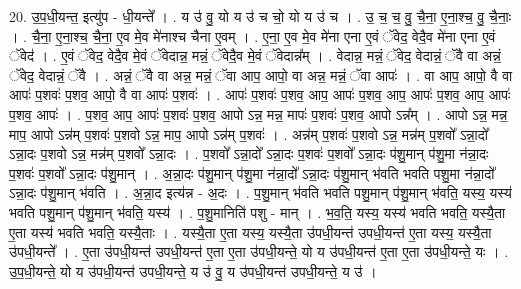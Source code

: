 \documentclass[17pt]{extarticle}
\begin{document}
20. उ॒प॒धी॒यन्त॒ इत्यु॑प - धी॒यन्ते᳚ । . य उ॑ वु॒ यो य उ॑ च चो॒ यो य उ॑ च । . उ॒ च॒ च॒ वु॒ चै॒ना॒ ए॒ना॒श्च॒ वु॒ चै॒नाः॒ । . चै॒ना॒ ए॒ना॒श्च॒ चै॒ना॒ ए॒व मे॒व मे॑नाश्च चैना ए॒वम् । . ए॒ना॒ ए॒व मे॒व मे॑ना एना ए॒वं ॅवेद॒ वेदै॒व मे॑ना एना ए॒वं ॅवेद॑ । . ए॒वं ॅवेद॒ वेदै॒व मे॒वं ॅवेदान्न॒ मन्नं॒ ॅवेदै॒व मे॒वं ॅवेदान्न᳚म् । . वेदान्न॒ मन्नं॒ ॅवेद॒ वेदान्नं॒ ॅवै वा अन्नं॒ ॅवेद॒ वेदान्नं॒ ॅवै । . अन्नं॒ ॅवै वा अन्न॒ मन्नं॒ ॅवा आप॒ आपो॒ वा अन्न॒ मन्नं॒ ॅवा आपः॑ । . वा आप॒ आपो॒ वै वा आपः॑ प॒शवः॑ प॒शव॒ आपो॒ वै वा आपः॑ प॒शवः॑ । . आपः॑ प॒शवः॑ प॒शव॒ आप॒ आपः॑ प॒शव॒ आप॒ आपः॑ प॒शव॒ आप॒ आपः॑ प॒शव॒ आपः॑ । . प॒शव॒ आप॒ आपः॑ प॒शवः॑ प॒शव॒ आपो ऽन्न॒ मन्न॒ मापः॑ प॒शवः॑ प॒शव॒ आपो ऽन्न᳚म् । . आपो ऽन्न॒ मन्न॒ माप॒ आपो ऽन्न॑म् प॒शवः॑ प॒शवो ऽन्न॒ माप॒ आपो ऽन्न॑म् प॒शवः॑ । . अन्न॑म् प॒शवः॑ प॒शवो ऽन्न॒ मन्न॑म् प॒शवो᳚ ऽन्ना॒दो᳚ ऽन्ना॒दः प॒शवो ऽन्न॒ मन्न॑म् प॒शवो᳚ ऽन्ना॒दः । . प॒शवो᳚ ऽन्ना॒दो᳚ ऽन्ना॒दः प॒शवः॑ प॒शवो᳚ ऽन्ना॒दः प॑शु॒मान् प॑शु॒मा न॑न्ना॒दः प॒शवः॑ प॒शवो᳚ ऽन्ना॒दः प॑शु॒मान् । . अ॒न्ना॒दः प॑शु॒मान् प॑शु॒मा न॑न्ना॒दो᳚ ऽन्ना॒दः प॑शु॒मान् भ॑वति भवति पशु॒मा न॑न्ना॒दो᳚ ऽन्ना॒दः प॑शु॒मान् भ॑वति । . अ॒न्ना॒द इत्य॑न्न - अ॒दः । . प॒शु॒मान् भ॑वति भवति पशु॒मान् प॑शु॒मान् भ॑वति॒ यस्य॒ यस्य॑ भवति पशु॒मान् प॑शु॒मान् भ॑वति॒ यस्य॑ । . प॒शु॒मानिति॑ पशु - मान् । . भ॒व॒ति॒ यस्य॒ यस्य॑ भवति भवति॒ यस्यै॒ता ए॒ता यस्य॑ भवति भवति॒ यस्यै॒ताः । . यस्यै॒ता ए॒ता यस्य॒ यस्यै॒ता उ॑पधी॒यन्त॑ उपधी॒यन्त॑ ए॒ता यस्य॒ यस्यै॒ता उ॑पधी॒यन्ते᳚ । . ए॒ता उ॑पधी॒यन्त॑ उपधी॒यन्त॑ ए॒ता ए॒ता उ॑पधी॒यन्ते॒ यो य उ॑पधी॒यन्त॑ ए॒ता ए॒ता उ॑पधी॒यन्ते॒ यः । . उ॒प॒धी॒यन्ते॒ यो य उ॑पधी॒यन्त॑ उपधी॒यन्ते॒ य उ॑ वु॒ य उ॑पधी॒यन्त॑ उपधी॒यन्ते॒ य उ॑ । \newline
\end{document}
